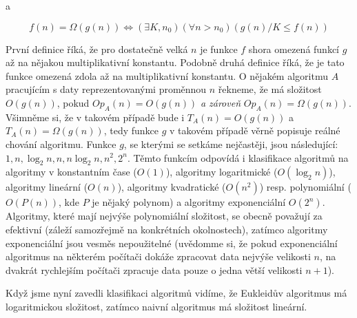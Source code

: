 a

\begin{displaymath}
 f(n) = \Omega(g(n)) \iff (\exists K,n_0)(\forall n>n_0)(g(n)/K\leq f(n))
\end{displaymath}

První definice říká, že pro dostatečně velká $n$ je funkce $f$ shora omezená funkcí $g$ až na nějakou multiplikativní konstantu. Podobně
druhá definice říká, že je tato funkce omezená zdola až na multiplikativní konstantu. O nějakém algoritmu $A$ pracujícím s daty reprezentovanými
proměnnou $n$ řekneme, že má složitost $O(g(n))$, pokud $Op_A(n) = O(g(n))$ \emph{a zároveň} $Op_A(n) = \Omega(g(n))$. Všimněme si, že v takovém
případě bude i $T_A(n) = O(g(n))$ a $T_A(n)=\Omega(g(n))$, tedy funkce $g$ v takovém případě věrně popisuje reálné chování algoritmu. Funkce $g$,
se kterými se setkáme nejčastěji, jsou následující: $1, n, \log_2 n, n, n\log_2 n, n^2, 2^n$. Těmto funkcím odpovídá i klasifikace algoritmů na
algoritmy v konstantním čase ($O(1)$), algoritmy logaritmické ($O(\log_2 n)$), algoritmy lineární ($O(n)$), algoritmy kvadratické ($O(n^2)$) resp.
polynomiální ($O(P(n))$, kde $P$ je nějaký polynom) a algoritmy exponenciální $O(2^n)$. Algoritmy, které mají nejvýše polynomiální složitost, se
obecně považují za efektivní (záleží samozřejmě na konkrétních okolnostech), zatímco algoritmy exponenciální jsou vesměs nepoužitelné (uvědomme si,
že pokud exponenciální algoritmus na některém počítači dokáže zpracovat data nejvýše velikosti $n$, na dvakrát rychlejším počítači zpracuje data
pouze o jedna větší velikosti $n+1$).

Když jsme nyní zavedli klasifikaci algoritmů vidíme, že Eukleidův algoritmus má logaritmickou složitost, zatímco naivní algoritmus má složitost
lineární.

\ifx\ucebnice\undefined

\fi